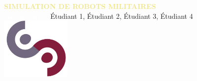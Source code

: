 \documentclass[a0,landscape]{a0poster}
\begin{document}
\begin{militarybox}
\begin{center}
    {\LARGE\bfseries\sffamily \textcolor{khaki}{SIMULATION DE ROBOTS MILITAIRES}}\\[0.5ex]
    \normalsize\textbf{\textcolor{white}{Groupe n°\ldots:}} \textcolor{deserttan}{Étudiant 1, Étudiant 2, Étudiant 3, Étudiant 4}\\[1ex]
    
    \includegraphics[height=3cm]{logo_cs.jpg}
\end{center}
\end{militarybox}

\vspace{0.5cm}
\end{document}
